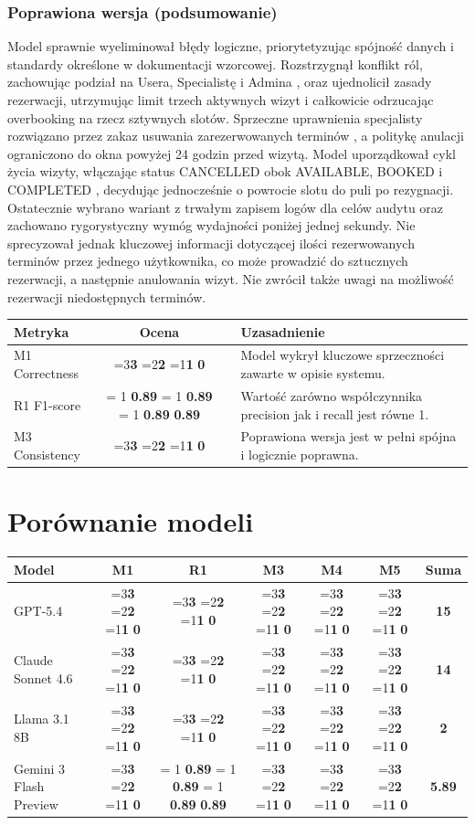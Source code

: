 \documentclass[12pt,a4paper]{article}
\newcommand{\scorebox}[1]{%
  \ifnum#1=3\colorbox{score3}{\textbf{3}}%
  \else\ifnum#1=2\colorbox{score2}{\textbf{2}}%
  \else\ifnum#1=1\colorbox{score1}{\textbf{1}}%
  \else\colorbox{score0}{\textbf{0}}\fi\fi\fi
}
\newcommand{\fonescorebox}[1]{%
    \ifnum\fpeval{#1 >= 0.8} = 1
        \colorbox{score3}{\textbf{#1}}%
    \else
        \ifnum\fpeval{#1 >= 0.6} = 1
            \colorbox{score2}{\textbf{#1}}%
        \else
            \ifnum\fpeval{#1 >= 0.4} = 1
                \colorbox{score1}{\textbf{#1}}%
            \else
                \colorbox{score0}{\textbf{#1}}%
            \fi
        \fi
    \fi
}
\begin{document}
\subsubsection{Poprawiona wersja (podsumowanie)}
\small
Model sprawnie wyeliminował błędy logiczne, priorytetyzując spójność danych i standardy określone w dokumentacji wzorcowej. Rozstrzygnął konflikt ról, zachowując podział na Usera, Specialistę i Admina , oraz ujednolicił zasady rezerwacji, utrzymując limit trzech aktywnych wizyt i całkowicie odrzucając overbooking na rzecz sztywnych slotów. Sprzeczne uprawnienia specjalisty rozwiązano przez zakaz usuwania zarezerwowanych terminów , a politykę anulacji ograniczono do okna powyżej 24 godzin przed wizytą. Model uporządkował cykl życia wizyty, włączając status CANCELLED obok AVAILABLE, BOOKED i COMPLETED , decydując jednocześnie o powrocie slotu do puli po rezygnacji. Ostatecznie wybrano wariant z trwałym zapisem logów dla celów audytu oraz zachowano rygorystyczny wymóg wydajności poniżej jednej sekundy. Nie sprecyzował jednak kluczowej informacji dotyczącej ilości rezerwowanych terminów przez jednego użytkownika, co może prowadzić do sztucznych rezerwacji, a następnie anulowania wizyt. Nie zwrócił także uwagi na możliwość rezerwacji niedostępnych terminów. 
\normalsize

\vspace{0.5em}
\begin{tabular}{lccl}
\toprule
\textbf{Metryka} & \textbf{Ocena} & & \textbf{Uzasadnienie} \\
\midrule
M1 Correctness    & \scorebox{2} && Model wykrył kluczowe sprzeczności zawarte w opisie systemu. \\
R1 F1-score   & \fonescorebox{0.89} && Wartość zarówno współczynnika precision jak i recall jest równe 1. \\
M3 Consistency    & \scorebox{3} && Poprawiona wersja jest w pełni spójna i logicznie poprawna. \\
\bottomrule
\end{tabular}


\section{Porównanie modeli}

\begin{tabular}{lccccc|c}
\toprule
\textbf{Model} & \textbf{M1} & \textbf{R1} & \textbf{M3} & \textbf{M4} & \textbf{M5} & \textbf{Suma} \\
\midrule
GPT-5.4            & \scorebox{3} & \scorebox{3} & \scorebox{3} & \scorebox{3} & \scorebox{3} & \textbf{15} \\
Claude Sonnet 4.6  & \scorebox{3} & \scorebox{2} & \scorebox{3} & \scorebox{3} & \scorebox{3} & \textbf{14} \\
Llama 3.1 8B       & \scorebox{0} & \scorebox{0} & \scorebox{1} & \scorebox{1} & \scorebox{0} & \textbf{2}  \\
Gemini 3 Flash Preview & \scorebox{2} & \fonescorebox{0.89} & \scorebox{3} & \scorebox{0} & \scorebox{0} & \textbf{5.89} \\
\bottomrule
\end{tabular}
\end{document}
